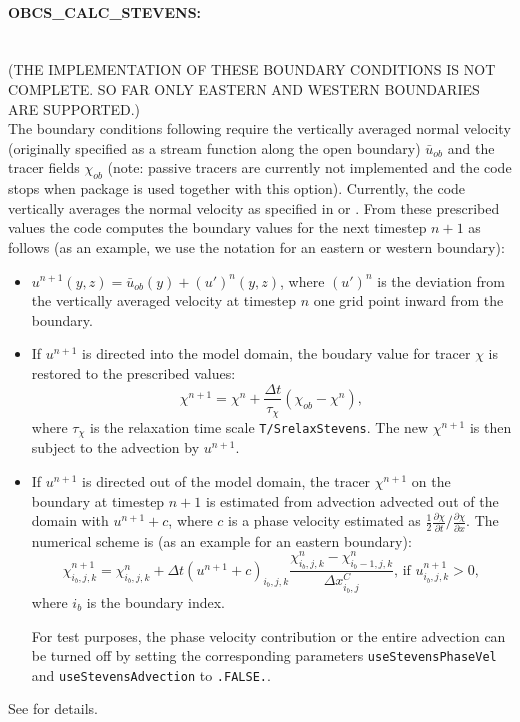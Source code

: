\paragraph{OBCS\_CALC\_STEVENS:} ~ \\
(THE IMPLEMENTATION OF THESE BOUNDARY CONDITIONS IS NOT COMPLETE. SO
FAR ONLY EASTERN AND WESTERN BOUNDARIES ARE SUPPORTED.) \\
The boundary conditions following \citet{stevens:90} require the
vertically averaged normal velocity (originally specified as a stream
function along the open boundary) $\bar{u}_{ob}$ and the tracer fields
$\chi_{ob}$ (note: passive tracers are currently not implemented and
the code stops when package  is used together with this
option). Currently, the code vertically averages the normal velocity
as specified in  or . From these
prescribed values the code computes the boundary values for the next
timestep $n+1$ as follows (as an example, we use the notation for an
eastern or western boundary):
\begin{itemize}
\item $u^{n+1}(y,z) = \bar{u}_{ob}(y) + (u')^{n}(y,z)$, where $(u')^{n}$
  is the deviation from the vertically averaged velocity at timestep
  $n$ one grid point inward from the boundary.
\item If $u^{n+1}$ is directed into the model domain, the boudary
  value for tracer $\chi$ is restored to the prescribed values:
  \[\chi^{n+1} =   \chi^{n} + \frac{\Delta{t}}{\tau_\chi} (\chi_{ob} -
  \chi^{n}),\] where $\tau_\chi$ is the relaxation time
  scale \texttt{T/SrelaxStevens}. The new $\chi^{n+1}$ is then subject
  to the advection by $u^{n+1}$.
\item If $u^{n+1}$ is directed out of the model domain, the tracer
  $\chi^{n+1}$ on the boundary at timestep $n+1$ is estimated from
  advection advected out of the domain with $u^{n+1}+c$, where $c$ is
  a phase velocity estimated as
  $\frac{1}{2}\frac{\partial\chi}{\partial{t}}/\frac{\partial\chi}{\partial{x}}$. The
  numerical scheme is (as an example for an eastern boundary):
  \[\chi_{i_{b},j,k}^{n+1} =   \chi_{i_{b},j,k}^{n} + \Delta{t} 
  (u^{n+1}+c)_{i_{b},j,k}\frac{\chi_{i_{b},j,k}^{n}
    - \chi_{i_{b}-1,j,k}^{n}}{\Delta{x}_{i_{b},j}^{C}}\mbox{, if }u_{i_{b},j,k}^{n+1}>0,
  \] where $i_{b}$ is the boundary index.

  For test purposes, the phase velocity contribution or the entire
  advection can be turned off by setting the corresponding parameters
  \texttt{useStevensPhaseVel} and \texttt{useStevensAdvection} to
  \texttt{.FALSE.}.\end{itemize} See \citet{stevens:90} for details.

